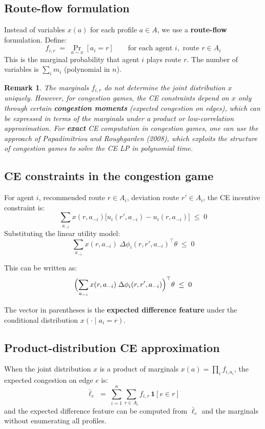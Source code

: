 \documentclass[11pt]{article}
\newtheorem{remark}{Remark}
\begin{document}
\subsection{Route-flow formulation}

Instead of variables $x(a)$ for each profile $a \in A$, we use a \textbf{route-flow} formulation. Define:
\[
f_{i,r} \;=\; \Pr_{a \sim x}[a_i = r] \qquad \text{for each agent } i, \text{ route } r \in A_i
\]
This is the marginal probability that agent $i$ plays route $r$. The number of variables is $\sum_i m_i$ (polynomial in $n$).

\begin{remark}
The marginals $f_{i,r}$ do not determine the joint distribution $x$ uniquely. However, for congestion games, the CE constraints depend on $x$ only through certain \textbf{congestion moments} (expected congestion on edges), which can be expressed in terms of the marginals under a product or low-correlation approximation. For \textbf{exact} CE computation in congestion games, one can use the approach of Papadimitriou and Roughgarden (2008), which exploits the structure of congestion games to solve the CE LP in polynomial time.
\end{remark}

\subsection{CE constraints in the congestion game}

For agent $i$, recommended route $r \in A_i$, deviation route $r' \in A_i$, the CE incentive constraint is:
\[
\sum_{a_{-i}} x(r, a_{-i}) \bigl[u_i(r', a_{-i}) - u_i(r, a_{-i})\bigr] \;\leq\; 0
\]
Substituting the linear utility model:
\[
\sum_{a_{-i}} x(r, a_{-i})\; \Delta\phi_i(r, r', a_{-i})^\top \theta \;\leq\; 0
\]

This can be written as:
\[
\Bigl(\sum_{a_{-i}} x(r, a_{-i})\; \Delta\phi_i(r, r', a_{-i})\Bigr)^\top \theta \;\leq\; 0
\]

The vector in parentheses is the \textbf{expected difference feature} under the conditional distribution $x(\cdot \mid a_i = r)$.

\subsection{Product-distribution CE approximation}

When the joint distribution $x$ is a product of marginals $x(a) = \prod_i f_{i, a_i}$, the expected congestion on edge $e$ is:
\[
\bar{\ell}_e \;=\; \sum_{i=1}^n \sum_{r \in A_i} f_{i,r}\, \mathbf{1}[e \in r]
\]
and the expected difference feature can be computed from $\bar{\ell}_e$ and the marginals without enumerating all profiles.
\end{document}
